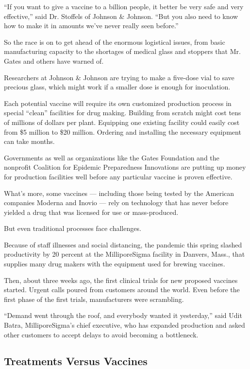 ``If you want to give a vaccine to a billion people, it better be very
safe and very effective,'' said Dr. Stoffels of Johnson \& Johnson.
``But you also need to know how to make it in amounts we've never really
seen before.''

So the race is on to get ahead of the enormous logistical issues, from
basic manufacturing capacity to the shortages of medical glass and
stoppers that Mr. Gates and others have warned of.

Researchers at Johnson \& Johnson are trying to make a five-dose vial to
save precious glass, which might work if a smaller dose is enough for
inoculation.

Each potential vaccine will require its own customized production
process in special ``clean'' facilities for drug making. Building from
scratch might cost tens of millions of dollars per plant. Equipping one
existing facility could easily cost from \$5 million to \$20 million.
Ordering and installing the necessary equipment can take months.

Governments as well as organizations like the Gates Foundation and the
nonprofit Coalition for Epidemic Preparedness Innovations are putting up
money for production facilities well before any particular vaccine is
proven effective.

What's more, some vaccines --- including those being tested by the
American companies Moderna and Inovio --- rely on technology that has
never before yielded a drug that was licensed for use or mass-produced.

But even traditional processes face challenges.

Because of staff illnesses and social distancing, the pandemic this
spring slashed productivity by 20 percent at the MilliporeSigma facility
in Danvers, Mass., that supplies many drug makers with the equipment
used for brewing vaccines.

Then, about three weeks ago, the first clinical trials for new proposed
vaccines started. Urgent calls poured from customers around the world.
Even before the first phase of the first trials, manufacturers were
scrambling.

``Demand went through the roof, and everybody wanted it yesterday,''
said Udit Batra, MilliporeSigma's chief executive, who has expanded
production and asked other customers to accept delays to avoid becoming
a bottleneck.

\hypertarget{treatments-versus-vaccines}{%
\subsection{Treatments Versus
Vaccines}\label{treatments-versus-vaccines}}

